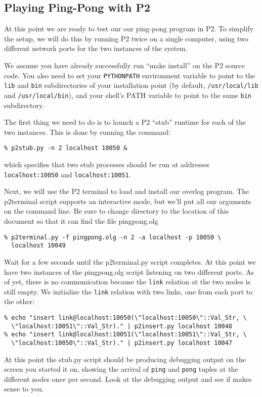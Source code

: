 \documentclass{article}
\begin{document}


\subsection{Playing Ping-Pong with P2}
At this point we are ready to test our our ping-pong program in P2.
To simplify the setup, we will do this by running P2 twice on a single
computer, using two different network ports for the two instances of
the system.

We assume you have already successfully run ``make install'' on the P2
source code.  You also need to set your \lstinline$PYTHONPATH$ environment
variable to point to the \lstinline$lib$ and \lstinline$bin$
subdirectories of your installation point (by default,
\lstinline$/usr/local/lib$ and \lstinline$/usr/local/bin$), and your
shell's PATH variable to point to the same \lstinline$bin$
subdirectory.

The first thing we need to do is to launch a P2 ``stub'' runtime for
each of the two instances.  This is done by running the command:
\begin{verbatim}
% p2stub.py -n 2 localhost 10050 &
\end{verbatim}
which specifies that two stub processes should be run at addresses
\lstinline$localhost:10050$ and \lstinline$localhost:10051$.

Next, we will use the P2 terminal to load and install our overlog
program.  The p2terminal script supports an interactive mode, but
we'll put all our arguments on the command line.  Be sure to change
directory to the location of this document so that it can find the
file pingpong.olg
\begin{verbatim}
% p2terminal.py -f pingpong.olg -n 2 -a localhost -p 10050 \
  localhost 10049
\end{verbatim}
Wait for a few seconds until the p2terminal.py script completes.  At
this point we have two instances of the pingpong.olg script listening
on two different ports.  As of yet, there is no communication because
the \lstinline$link$ relation at the two nodes is still empty.  We
initialize the \lstinline$link$ relation with two links, one from each
port to the other:
\begin{verbatim}
% echo "insert link@localhost:10050(\"localhost:10050\"::Val_Str, \
  \"localhost:10051\"::Val_Str)." | p2insert.py localhost 10048
% echo "insert link@localhost:10051(\"localhost:10051\"::Val_Str, \
  \"localhost:10050\"::Val_Str)." | p2insert.py localhost 10047
\end{verbatim}
At this point the stub.py script should be producing debugging output
on the screen you started it on, showing the arrival of
\lstinline$ping$ and \lstinline$pong$ tuples at the different nodes
once per second.  Look at the debugging output and see if makes sense
to you.
\end{document}
